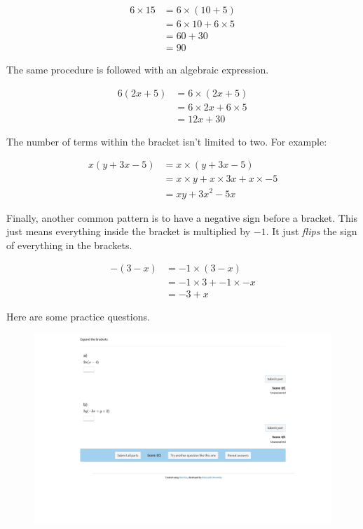\documentclass[
  a4paper,
]{scrbook}
\begin{document}
\[
\begin{aligned} 
6 \times 15 &= 6 \times (10 + 5)\\
&= 6 \times 10 + 6 \times 5\\
&= 60 + 30\\
&= 90 
\end{aligned}
\]

The same procedure is followed with an algebraic expression.

\[
\begin{aligned} 
6(2x+5) &= 6 \times (2x + 5) \\
&= 6 \times 2x + 6 \times 5 \\
&= 12x + 30
\end{aligned}
\]

The number of terms within the bracket isn't limited to two. For
example:

\[
\begin{aligned} x(y + 3x -5) &= x \times (y + 3x -5) \\
&= x \times y + x \times 3x + x \times -5\\
&= xy + 3x^2 - 5x
\end{aligned}
\]

Finally, another common pattern is to have a negative sign before a
bracket. This just means everything inside the bracket is multiplied by
\(-1\). It just \emph{flips} the sign of everything in the brackets.

\[
\begin{aligned} -(3-x) &= -1 \times (3-x) \\
&= -1 \times 3 + -1 \times -x \\
&= -3+ x
\end{aligned}
\]

Here are some practice questions.

\begin{figure}

{\centering 

\href{https://numbas.mathcentre.ac.uk/question/127002/algebra-expanding-single-brackets/embed/?token=7f05cd3a-ac38-4f05-8866-e3fa3c6b280c}{\includegraphics{./03-expressions_with_brackets_files/figure-pdf/unnamed-chunk-1-1.png}}

}

\end{figure}
\end{document}
